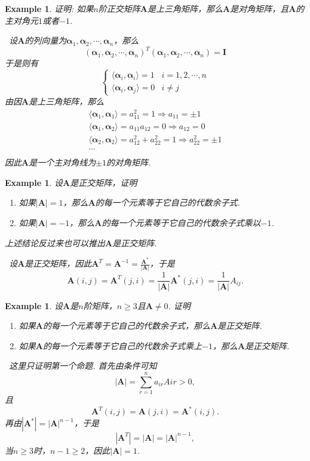 \documentclass{article}
\newtheorem{example}[theorem]{Example}
\newcommand{\hints}{{\color{blue} \text{hints}}}
\newcommand{\mbf}[1]{\bm{#1}}
\newcommand\inp[2]{\langle #1, #2 \rangle} %
\begin{document}
\begin{example}
\rm 证明: 如果$n$阶正交矩阵$\mbf{A}$是上三角矩阵，那么$\mbf{A}$是对角矩阵，且$\mbf{A}$的主对角元$1$或者$-1$.

\hints\ 设$\mbf{A}$的列向量为$\mbf{\alpha}_1,\mbf{\alpha}_2,\cdots,\mbf{\alpha}_n$，那么
$$
(\mbf{\alpha}_1,\mbf{\alpha}_2,\cdots,\mbf{\alpha}_n)^T(\mbf{\alpha}_1,\mbf{\alpha}_2,\cdots,\mbf{\alpha}_n) = \mbf{I}
$$
于是则有
$$
\left\{
\begin{array}{ll}
\inp{\mbf{\alpha}_i}{\mbf{\alpha}_i} = 1 & i=1,2,\cdots,n \\
\inp{\mbf{\alpha}_i}{\mbf{\alpha}_j} = 0 & i \neq j
\end{array} \right.
$$ 
由因$\mbf{A}$是上三角矩阵，那么
$$
\begin{array}{ll}
\inp{\mbf{\alpha}_1}{\mbf{\alpha}_1} = a_{11}^2 = 1 \Rightarrow a_{11} = \pm 1 \\
\inp{\mbf{\alpha}_1}{\mbf{\alpha}_2} = a_{11}a_{12} = 0 \Rightarrow a_{12} = 0  \\
\inp{\mbf{\alpha}_2}{\mbf{\alpha}_2} = a_{12}^2 +a_{22}^2 = 1 \Rightarrow a_{22}^2 = \pm 1 \\
\cdots \\
\end{array}
$$
因此$\mbf{A}$是一个主对角线为$\pm 1$的对角矩阵. 
\end{example}

\begin{example}
\rm 设$\mbf{A}$是正交矩阵，证明
\begin{enumerate}
	\item 如果$|\mbf{A}| = 1$，那么$\mbf{A}$的每一个元素等于它自己的代数余子式.
	\item 如果$|\mbf{A}| = -1$，那么$\mbf{A}$的每一个元素等于它自己的代数余子式乘以$-1$.
\end{enumerate}
上述结论反过来也可以推出$\mbf{A}$是正交矩阵. 

\hints\ 设$\mbf{A}$是正交矩阵，因此$\mbf{A}^T = \mbf{A}^{-1} = \frac{\mbf{A}^*}{|\mbf{A}|}$，于是
$$
\mbf{A}(i,j) = \mbf{A}^T(j,i) = \frac{1}{|\mbf{A}|}\mbf{A}^*(j,i) = \frac{1}{|\mbf{A}|}A_{ij}. 
$$
\end{example}

\begin{example}
\rm 设$\mbf{A}$是$n$阶矩阵，$n \geq 3$且$\mbf{A} \neq 0$. 证明
\begin{enumerate}
	\item 如果$\mbf{A}$的每一个元素等于它自己的代数余子式，那么$\mbf{A}$是正交矩阵. 
	\item 如果$\mbf{A}$的每一个元素等于它自己的代数余子式乘上$-1$，那么$\mbf{A}$是正交矩阵. 
\end{enumerate}

\hints\  这里只证明第一个命题. 首先由条件可知
$$
|\mbf{A}| = \sum\limits_{r=1}^n a_{ir}A{ir} > 0,
$$
且
$$
\mbf{A}^T(i,j) = \mbf{A}(j,i) = \mbf{A}^*(i,j).
$$
再由$|\mbf{A}^*| = |\mbf{A}|^{n-1}$，于是
$$
|\mbf{A}^T| = |\mbf{A}| = |\mbf{A}|^{n-1},
$$
当$n \geq 3$时，$n-1 \geq 2$，因此$|\mbf{A}|=1$.  
\end{example}
\end{document}
